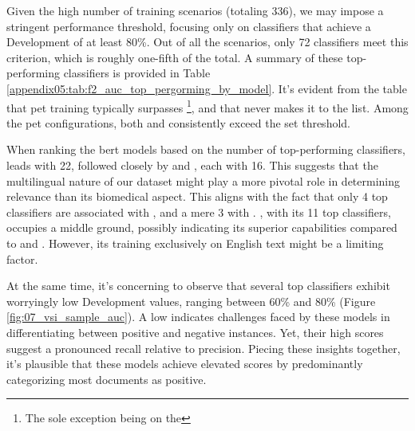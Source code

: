 Given the high number of training scenarios (totaling $336$), we may impose a stringent performance threshold, focusing only on classifiers that achieve a Development \fTwo{} of at least 80\%. 
Out of all the scenarios, only 72 classifiers meet this criterion, which is roughly one-fifth of the total.
A summary of these top-performing classifiers is provided in Table \ref{appendix05:tab:f2_auc_top_pergorming_by_model}. It's evident from the table that \gls{pet} training typically surpasses \finetuning{}\footnote{The sole exception being \bertxlmroberta{} on the \trafilaturaFulltext{}}, and that 
\unbalanced{} never makes it to the list. 
Among the \gls{pet} configurations, both \petFiveHundred{} and \petThousand{} consistently exceed the set threshold.


When ranking the \gls{bert} models based on the number of top-performing classifiers, \bertxlmroberta{} leads with 22, followed closely by \bertmultilingual{} and \bertbiolinkbert{}, each with 16. 
This suggests that the multilingual nature of our dataset might play a more pivotal role in determining relevance than its biomedical aspect. 
This aligns with the fact that only 4 top classifiers are associated with \bertscibert{}, and a mere 3 with \bertbase{}. 
\bertroberta{}, with its 11 top classifiers, occupies a middle ground, possibly indicating its superior capabilities compared to \bertbase{} and \bertscibert{}. However, its training exclusively on English text might be a limiting factor.

At the same time, it's concerning to observe that several top classifiers exhibit worryingly low Development \auc{} values, ranging between 60\% and 80\% (Figure \ref{fig:07_vsi_sample_auc}). 
A low \auc{} indicates challenges faced by these models in differentiating between positive and negative instances. 
Yet, their high \fTwo{} scores suggest a pronounced recall relative to precision. 
Piecing these insights together, it's plausible that these models achieve elevated \fTwo{} scores by predominantly categorizing most documents as positive.


